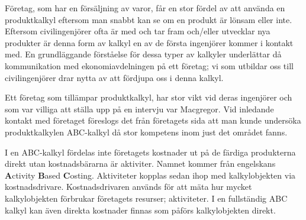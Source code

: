 Företag, som har en försäljning av varor, får en stor fördel av att använda en produktkalkyl eftersom man snabbt kan se om en produkt är lönsam eller inte.
Eftersom civilingenjörer ofta är med och tar fram och/eller utvecklar nya produkter är denna form av kalkyl en av de första ingenjörer kommer i kontakt med.
En grundläggande förståelse för dessa typer av kalkyler underlättar då kommunikation med ekonomiavdelningen på ett företag; vi som utbildar oss till civilingenjörer drar nytta av att fördjupa oss i denna kalkyl. 

Ett företag som tillämpar produktkalkyl, har stor vikt vid deras ingenjörer och som var villiga att ställa upp på en intervju var Macgregor. 
Vid inledande kontakt med företaget föreslogs det från företagets sida att man kunde undersöka produktkalkylen ABC-kalkyl då stor kompetens inom just det området fanns.



I en ABC-kalkyl fördelas inte företagets kostnader ut på de färdiga produkterna direkt utan kostnadsbärarna är aktiviter.
Namnet kommer från engelskans {\bf A}ctivity {\bf B}ased {\bf C}osting.
Aktiviteter kopplas sedan ihop med kalkylobjekten via kostnadsdrivare.
Kostnadsdrivaren används för att mäta hur mycket kalkylobjekten förbrukar företagets resurser; aktiviteter.
I en fullständig ABC kalkyl kan även direkta kostnader finnas som påförs kalkylobjekten direkt.





%
%

